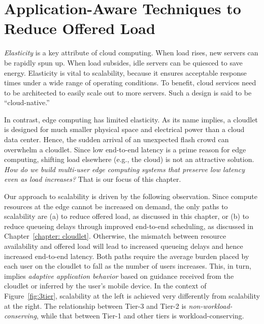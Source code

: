 \chapter{Application-Aware Techniques to Reduce Offered Load}
\label{chapter: load}

{\em Elasticity} is a key attribute of cloud computing.  When load
rises, new servers can be rapidly spun up.  When load subsides, idle
servers can be quiesced to save energy.  Elasticity is vital to
scalability, because it ensures acceptable response times under a wide
range of operating conditions.  To benefit, cloud services need to be
architected to easily scale out to more servers.  Such a design is
said to be ``cloud-native.''

In contrast, edge computing has limited elasticity.  As its name implies, a
cloudlet is designed for much smaller physical space and electrical power than a
cloud data center.  Hence, the sudden arrival of an unexpected flash crowd can
overwhelm a cloudlet.  Since low end-to-end latency is a prime reason for edge
computing, shifting load elsewhere (e.g., the cloud) is not an attractive
solution.  {\em How do we build multi-user edge computing systems that preserve
low latency even as load increases?}  That is our focus of this chapter.

Our approach to scalability is driven by the following observation. Since
compute resources at the edge cannot be increased on demand, the only paths to
scalability are (a) to reduce offered load, as discussed in this chapter,
or (b) to reduce queueing delays through improved end-to-end scheduling,
as discussed in Chapter~\ref{chapter: cloudlet}.  Otherwise, the mismatch between
resource availability and offered load will lead to increased queueing delays
and hence increased end-to-end latency.  Both paths require the average burden
placed by each user on the cloudlet to fall as the number of users increases.
This, in turn, implies {\em adaptive application behavior} based on guidance
received from the cloudlet or inferred by the user's mobile device.  In the
context of Figure~\ref{fig:3tier}, scalability at the left is achieved very
differently from scalability at the right.  The relationship between Tier-3 and
Tier-2 is {\em non-workload-conserving}, while that between Tier-1 and other
tiers is workload-conserving.

